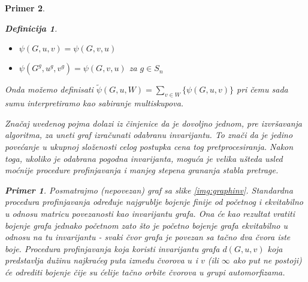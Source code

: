 \documentclass[12pt,oneside]{memoir}
\newtheorem{example}{Primer}
\theoremstyle{definition}
\newtheorem*{definition}{Definicija}
\begin{document}
\begin{example}
\begin{definition}
	  \begin{itemize}
		  \item[($\psi1$)] $\psi(G, u, v) = \psi(G, v, u)$
		  \item[($\psi2$)] $\psi(G^g, u^g, v^g) = \psi(G, v, u)$ za $g \in S_n$
	  \end{itemize}
  \end{definition}

  Onda možemo definisati $\widetilde{\psi}(G, u, W) = \sum_{v \in W} \{\psi(G, u, v)\}$ pri
  čemu sada sumu interpretiramo kao sabiranje multiskupova.

  Značaj uvedenog pojma dolazi iz činjenice da je dovoljno jednom, pre
  izvršavanja algoritma, za uneti graf izračunati odabranu invarijantu. To
  znači da je jedino povećanje u ukupnoj složenosti celog postupka cena tog
  pretprocesiranja. Nakon toga, ukoliko je odabrana pogodna invarijanta, moguća
  je velika ušteda usled moćnije procedure profinjavanja i manjeg stepena
  grananja stabla pretrage.

  \begin{example}
	  \label{ex:graphinv}
	  Posmatrajmo (nepovezan) graf sa slike \ref{img:graphinv}. Standardna
	  procedura profinjavanja određuje najgrublje bojenje finije od početnog i
	  ekvitabilno u odnosu matricu povezanosti kao invarijantu grafa. Ona će
	  kao rezultat vratiti bojenje grafa jednako početnom zato što je početno
	  bojenje grafa ekvitabilno u odnosu na tu invarijantu - svaki čvor grafa
	  je povezan sa tačno dva čvora iste boje.  Procedura profinjavanja koja
	  koristi invarijantu grafa $d(G, u, v)$ koja predstavlja dužinu najkraćeg
	  puta između čvorova $u$ i $v$ (ili $\infty$ ako put ne postoji) će
	  odrediti bojenje čije su ćelije tačno orbite čvorova u grupi
	  automorfizama.
  \end{example}

   \begin{figure}[htp]
	   \centering
\end{figure}
\end{example}
\end{document}
